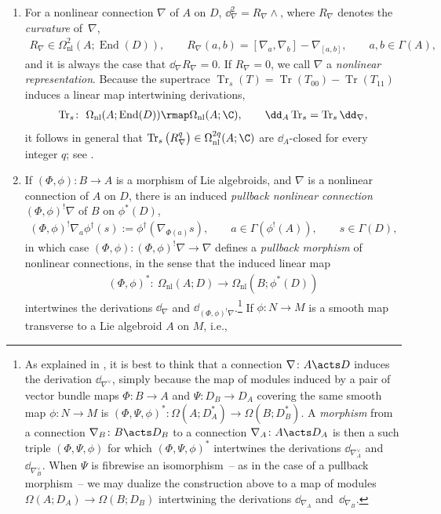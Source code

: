 \begin{enumerate}
\item For a nonlinear connection $\nabla$ of $A$ on $D$, $\dd_{\nabla}^2=R_{\nabla} \wedge $, where $R_{\nabla}$ denotes the \emph{curvature} of~$\nabla$,
\begin{gather*}
 R_{\nabla} \in \Omega^2_{\mathrm{nl}}(A;\operatorname{End}(D)), \qquad R_{\nabla}(a,b) = [\nabla_a,\nabla_b]-\nabla_{[a,b]}, \qquad a,b \in \Gamma(A),
\end{gather*}and it is always the case that $\dd_{\nabla}R_{\nabla} = 0$. If $R_{\nabla}=0$, we call $\nabla$ a \emph{nonlinear representation}. Because the supertrace $\operatorname{Tr}_s(T)=\operatorname{Tr}(T_{00})-\operatorname{Tr}(T_{11})$ induces a linear map intertwining derivations,\begin{gather*}\operatorname{Tr}_s \colon \ \Omega_{\mathrm{nl}}(A;\operatorname{End}(D)) \rmap \Omega_{\mathrm{nl}}(A;\C), \qquad \dd_A\operatorname{Tr}_s = \operatorname{Tr}_s\dd_{\nabla},\end{gather*}it follows in general that $\operatorname{Tr}_s\big(R_{\nabla}^q\big) \in \Omega^{2q}_{\mathrm{nl}}(A;\C)$ are $\dd_A$-closed for every integer $q$; see \cite{CrainicNL}.
 \item If $(\Phi,\phi)\colon B \to A$ is a morphism of Lie algebroids, and $\nabla$ is a nonlinear connection of $A$ on $D$, there is an induced \emph{pullback nonlinear connection} $(\Phi,\phi)^!\nabla$ of $B$ on $\phi^*(D)$,
 \begin{align*}\label{eq : pullback connection}
 (\Phi,\phi)^!\nabla_{a}\phi^{\dagger}(s):=\phi^{\dagger}(\nabla_{\Phi(a)}s), \qquad a \in \Gamma(\phi^!(A)), \qquad s \in \Gamma(D),
 \end{align*}in which case $(\Phi,\phi)\colon (\Phi,\phi)^!\nabla \to \nabla$ defines a \emph{pullback morphism} of nonlinear connections, in the sense that the induced linear map
 \begin{gather*}
 (\Phi,\phi)^*\colon \ \Omega_{\mathrm{nl}}(A;D)\to \Omega_{\mathrm{nl}}(B;\phi^*(D))
 \end{gather*}intertwines the derivations $\dd_{\nabla}$ and $\dd_{(\Phi,\phi)^!\nabla}$.\footnote{As explained in \cite{YvetteLaurentAlan}, it is best to think that a connection $\nabla \colon A \acts D$ induces the derivation $\dd_{\nabla^{\vee}}$, simply because the map of modules induced by a pair of vector bundle maps $\Phi\colon B \to A$ and $\Psi\colon D_B \to D_A$ covering the same smooth map $\phi\colon N \to M$ is $(\Phi,\Psi,\phi)^*\colon \Omega(A;D_A^*) \to \Omega(B;D_B^*)$. A \emph{morphism} from a connection $\nabla_B\colon B \acts D_B$ to a connection $\nabla_A \colon A \acts D_A$ is then a such triple $(\Phi,\Psi,\phi)$ for which $(\Phi,\Psi,\phi)^*$ intertwines the derivations $\dd_{\nabla^{\vee}_A}$ and $\dd_{\nabla^{\vee}_B}$. When $\Psi$ is fibrewise an isomorphism~-- as in the case of a pullback morphism~-- we may dualize the construction above to a map of modules $\Omega(A;D_A) \to \Omega(B;D_B)$ intertwining the derivations $\dd_{\nabla_A}$ and~$\dd_{\nabla_B}$.} If $\phi\colon N \to M$ is a smooth map transverse to a Lie algebroid $A$ on $M$, i.e.,

\end{enumerate}
